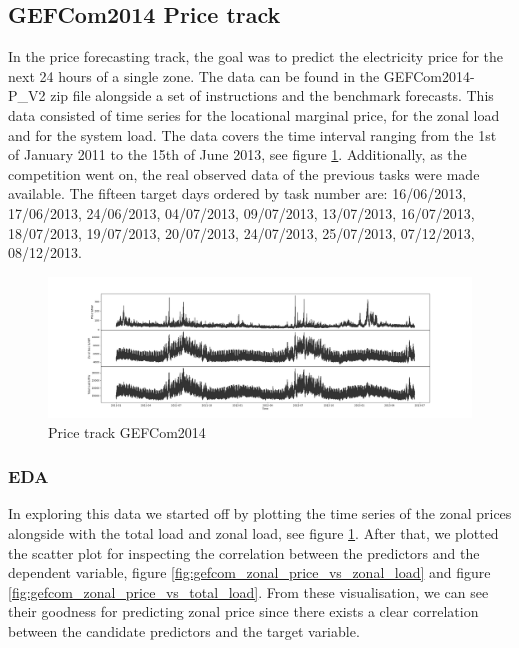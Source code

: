 \subsection{GEFCom2014 Price track}
In the price forecasting track, the goal was to predict the electricity price for the next 24 hours of a single zone. 
The data can be found in the GEFCom2014-P\_V2 zip file alongside a set of instructions and the benchmark forecasts.
This data consisted of time series for the locational marginal price, for the zonal load and for the system load. The data covers the time interval ranging from the 1st of January 2011 to the 15th of June 2013, see figure \ref{fig:price_track_fig1}. 
Additionally, as the competition went on, the real observed data of the previous tasks were made available.
The fifteen target days ordered by task number are: 16/06/2013, 17/06/2013, 24/06/2013, 04/07/2013, 09/07/2013, 13/07/2013, 16/07/2013, 18/07/2013, 19/07/2013, 20/07/2013, 24/07/2013, 25/07/2013, 07/12/2013, 08/12/2013. 
\begin{figure}[!h]
    \includegraphics[width=\textwidth]{images/price_track_fig1.png}
    \caption{Price track GEFCom2014}
    \label{fig:price_track_fig1}
\end{figure}
\subsubsection{EDA}
In exploring this data we started off by plotting the time series of the zonal prices alongside with the total load and zonal load, see figure \ref{fig:price_track_fig1}.
After that, we plotted the scatter plot for inspecting the correlation between the predictors and the dependent variable, figure \ref{fig:gefcom_zonal_price_vs_zonal_load} and figure \ref{fig:gefcom_zonal_price_vs_total_load}. From these visualisation, we can see their goodness for predicting zonal price since there exists a clear correlation between the candidate predictors and the target variable.

